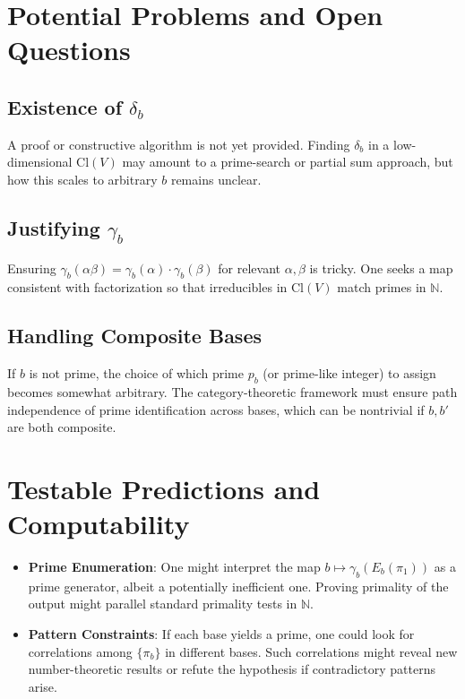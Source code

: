 \documentclass[11pt]{article}
\begin{document}
\section{Potential Problems and Open Questions}

\subsection{Existence of \texorpdfstring{$\delta_b$}{db}}
A proof or constructive algorithm is not yet provided. Finding 
$\delta_b$ in a low-dimensional $\mathrm{Cl}(V)$ may amount to 
a prime-search or partial sum approach, but how this scales 
to arbitrary $b$ remains unclear.

\subsection{Justifying \texorpdfstring{$\gamma_b$}{gb}}
Ensuring $\gamma_b(\alpha\beta) = \gamma_b(\alpha)\cdot \gamma_b(\beta)$ 
for relevant $\alpha,\beta$ is tricky. One seeks a map consistent 
with factorization so that irreducibles in $\mathrm{Cl}(V)$ 
match primes in $\mathbb{N}$.

\subsection{Handling Composite Bases}
If $b$ is not prime, the choice of which prime $p_b$ (or prime-like integer) 
to assign becomes somewhat arbitrary. The category-theoretic framework 
must ensure path independence of prime identification across bases, 
which can be nontrivial if $b,b'$ are both composite.

\section{Testable Predictions and Computability}

\begin{itemize}
\item \textbf{Prime Enumeration}: One might interpret the map 
  $b \mapsto \gamma_b(E_b(\pi_1))$ as a prime generator, albeit 
  a potentially inefficient one. Proving primality of the output 
  might parallel standard primality tests in $\mathbb{N}$.
\item \textbf{Pattern Constraints}: If each base yields a prime, 
  one could look for correlations among $\{\pi_b\}$ in different bases. 
  Such correlations might reveal new number-theoretic results or 
  refute the hypothesis if contradictory patterns arise.
\end{itemize}
\end{document}
